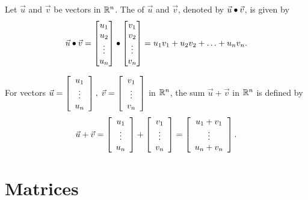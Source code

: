 \documentclass{ximera}
\begin{document}
\begin{definition}\label{def:dotproduct}
    Let $\vec{u}$ and $\vec{v}$ be vectors in $\RR^n$.  The  of $\vec{u}$ and $\vec{v}$, denoted by
    $\vec{u}\dotp \vec{v}$, is given by
    \begin{align*}
      \vec{u}\dotp\vec{v}=\begin{bmatrix}u_1\\u_2\\\vdots\\u_n\end{bmatrix}\dotp\begin{bmatrix}v_1\\v_2\\\vdots\\v_n\end{bmatrix}=u_1v_1+u_2v_2+\ldots+u_nv_n.
    \end{align*}
\end{definition}


\begin{definition}\label{def:vecadd}
    For vectors $\vec{u}=\startmat{c}
      u_1 \\
      \vdots \\
      u_n
    \stopmat,\; \vec{v}= \startmat{c}
      v_1 \\
      \vdots \\
      v_n
    \stopmat$ in $\R^n$, the sum $\vec{u}+\vec{v}$ in $\R^n$ is defined
    by
    \begin{equation*}
      \vec{u}+\vec{v} = \startmat{c}
        u_1 \\
        \vdots \\
        u_n
      \stopmat +  \startmat{c}
        v_1 \\
        \vdots \\
        v_n
      \stopmat
      = \startmat{c}
        u_1+v_1 \\
        \vdots \\
        u_n+v_n
      \stopmat.
    \end{equation*}
  \end{definition}

\section{Matrices}
\end{document}
